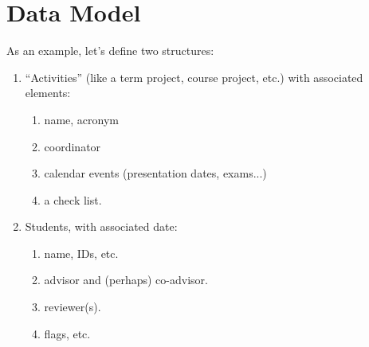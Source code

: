 \documentclass[10pt]{article}
\begin{document}



\begin{codestore}[ActivityUseDemo]
  
  
  
\end{codestore}


\begin{codestore}[ActivityUseDemo]
   

  
\end{codestore}






\section{Data Model}\label{DataModel}
As an example, let's define two structures:
\begin{enumerate}
  \item ``Activities'' (like a term project, course project, etc.)  with associated 
elements: 
\begin{enumerate}
  \item name, acronym
  \item coordinator
  \item calendar events (presentation dates, exams...)
  \item a check list.
\end{enumerate}

  \item Students, with associated date:
\begin{enumerate}
  \item name, IDs, etc.
  \item advisor and (perhaps) co-advisor.
  \item reviewer(s).
  \item flags, etc.
\end{enumerate}
  
  
\end{enumerate}
\end{document}
